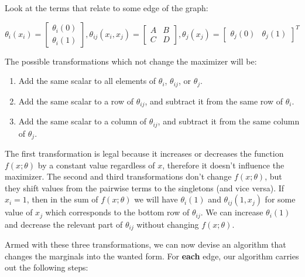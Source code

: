 \documentclass[11pt]{article}
\begin{document}
Look at the terms that relate to some edge of the graph:

\begin{equation}
\theta_{i}(x_i) =
\begin{bmatrix}
\theta_{i}(0) \\ \theta_{i}(1)
\end{bmatrix},
\theta_{ij}(x_i,x_j) =
\begin{bmatrix}
A & B \\
C & D
\end{bmatrix},
\theta_{j}(x_j) =
\begin{bmatrix}
\theta_{j}(0) & \theta_{j}(1)
\end{bmatrix}^T
\label{fig:1e-alg-start}
\end{equation}

The possible transformations which not change the maximizer will be:
\begin{enumerate}
\item Add the same scalar to all elements of $\theta_{i}$, $\theta_{ij}$, or $\theta_{j}$.
\item Add the same scalar to a row of $\theta_{ij}$, and subtract it from the same row of $\theta_{i}$.
\item Add the same scalar to a column of $\theta_{ij}$, and subtract it from the same column of $\theta_{j}$.
\end{enumerate}
The first transformation is legal because it increases or decreases the function $f(x; \theta)$ by a constant value regardless of $x$, therefore it doesn't influence the maximizer.
The second and third transformations don't change $f(x; \theta)$,
but they shift values from the pairwise terms to the singletons (and vice versa).
If $x_i = 1$, then in the sum of $f(x; \theta)$ we will have $\theta_{i}(1)$ and $\theta_{ij}(1, x_j)$ for some value of $x_j$ which corresponds to the bottom row of $\theta_{ij}$. We can increase $\theta_{i}(1)$ and decrease the relevant part of $\theta_{ij}$ without changing $f(x; \theta)$.

Armed with these three transformations, we can now devise an algorithm that changes the marginals into the wanted form. For \textbf{each} edge, our algorithm carries out the following steps:
\end{document}
